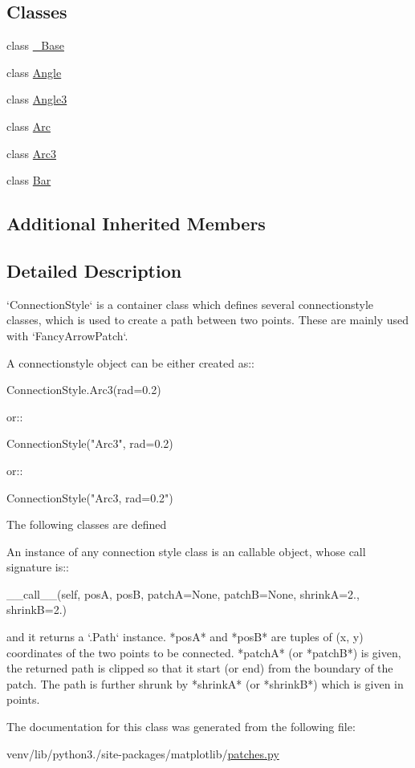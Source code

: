 \subsection*{Classes}
\begin{DoxyCompactItemize}
\item 
class \hyperlink{classmatplotlib_1_1patches_1_1ConnectionStyle_1_1__Base}{\+\_\+\+Base}
\item 
class \hyperlink{classmatplotlib_1_1patches_1_1ConnectionStyle_1_1Angle}{Angle}
\item 
class \hyperlink{classmatplotlib_1_1patches_1_1ConnectionStyle_1_1Angle3}{Angle3}
\item 
class \hyperlink{classmatplotlib_1_1patches_1_1ConnectionStyle_1_1Arc}{Arc}
\item 
class \hyperlink{classmatplotlib_1_1patches_1_1ConnectionStyle_1_1Arc3}{Arc3}
\item 
class \hyperlink{classmatplotlib_1_1patches_1_1ConnectionStyle_1_1Bar}{Bar}
\end{DoxyCompactItemize}
\subsection*{Additional Inherited Members}


\subsection{Detailed Description}
\begin{DoxyVerb}`ConnectionStyle` is a container class which defines
several connectionstyle classes, which is used to create a path
between two points.  These are mainly used with `FancyArrowPatch`.

A connectionstyle object can be either created as::

       ConnectionStyle.Arc3(rad=0.2)

or::

       ConnectionStyle("Arc3", rad=0.2)

or::

       ConnectionStyle("Arc3, rad=0.2")

The following classes are defined


An instance of any connection style class is an callable object,
whose call signature is::

    __call__(self, posA, posB,
             patchA=None, patchB=None,
             shrinkA=2., shrinkB=2.)

and it returns a `.Path` instance. *posA* and *posB* are
tuples of (x, y) coordinates of the two points to be
connected. *patchA* (or *patchB*) is given, the returned path is
clipped so that it start (or end) from the boundary of the
patch. The path is further shrunk by *shrinkA* (or *shrinkB*)
which is given in points.
\end{DoxyVerb}
 

The documentation for this class was generated from the following file\+:\begin{DoxyCompactItemize}
\item 
venv/lib/python3./site-\/packages/matplotlib/\hyperlink{patches_8py}{patches.\+py}\end{DoxyCompactItemize}
